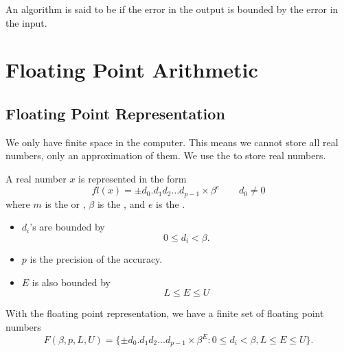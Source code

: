 \begin{definition}
    An algorithm is said to be  if the error in the output is bounded by the error in the input.
\end{definition}

\section{Floating Point Arithmetic}

\subsection{Floating Point Representation}

We only have finite space in the computer. This means we cannot store all real numbers, only an approximation of them. We use the  to store real numbers.

\begin{definition}
    A real number \( x \) is represented in the form \[
        fl(x) = \pm d_0 . d_1 d_2 \dots d_{p-1} \times \beta^e \qquad d_0 \neq 0
    \] where \( m \) is the  or , \( \beta \) is the , and \( e \) is the .
\end{definition}

\begin{note}
    \begin{itemize}
        \item \( d_i \)'s are bounded by \[
                  0 \leq d_i < \beta.
              \]

        \item \( p \) is the precision of the accuracy.

        \item \( E \) is also bounded by \[
                  L \leq E \leq U
              \]
    \end{itemize}
\end{note}

With the floating point representation, we have a finite set of floating point numbers \[
    F(\beta, p, L, U) = \{ \pm d_0 . d_1 d_2 \dots d_{p-1} \times \beta^E : 0 \leq d_i < \beta, L \leq E \leq U \}.
\]

